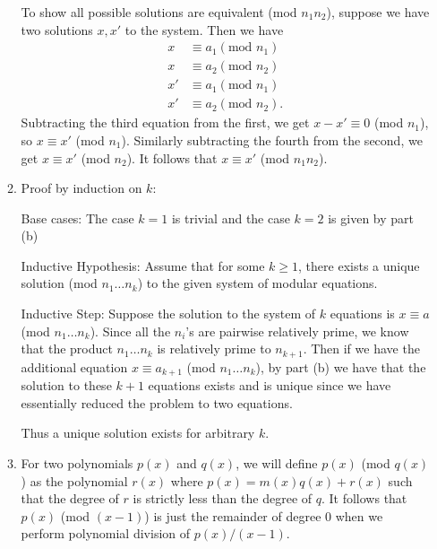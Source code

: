 \begin{enumerate}
\begin{enumerate}
            To show all possible solutions are equivalent (mod $n_1n_2$), suppose we have two solutions $x, x'$ to the system. Then we have \begin{align*}
                x &\equiv a_1 (\text{mod } n_1) \\
                x &\equiv a_2 (\text{mod } n_2) \\
                x' &\equiv a_1 (\text{mod } n_1) \\
                x' &\equiv a_2 (\text{mod } n_2).
            \end{align*}
            Subtracting the third equation from the first, we get $x - x' \equiv 0$ (mod $n_1$), so $x \equiv x'$ (mod $n_1$). Similarly subtracting the fourth from the second, we get $x \equiv x'$ (mod $n_2$). It follows that $x \equiv x'$ (mod $n_1n_2$).
        
            \item Proof by induction on $k$:
            
            Base cases: The case $k = 1$ is trivial and the case $k = 2$ is given by part (b)
            
            Inductive Hypothesis: Assume that for some $k \geq 1$, there exists a unique solution (mod $n_1 \ldots n_k$) to the given system of modular equations.
            
            Inductive Step: Suppose the solution to the system of $k$ equations is $x \equiv a$ (mod $n_1 \ldots n_k$). Since all the $n_i$'s are pairwise relatively prime, we know that the product $n_1 \ldots n_k$ is relatively prime to $n_{k+1}$. Then if we have the additional equation $x \equiv a_{k+1}$ (mod $n_1 \ldots n_k$), by part (b) we have that the solution to these $k + 1$ equations exists and is unique since we have essentially reduced the problem to two equations.
            
            Thus a unique solution exists for arbitrary $k$.
            
            \item For two polynomials $p(x)$ and $q(x)$, we will define $p(x)$ (mod $q(x)$) as the polynomial $r(x)$ where $p(x) = m(x)q(x) + r(x)$ such that the degree of $r$ is strictly less than the degree of $q$. It follows that $p(x)$ (mod $(x-1)$) is just the remainder of degree 0 when we perform polynomial division of $p(x) / (x - 1)$.
            

\end{enumerate}
\end{enumerate}
